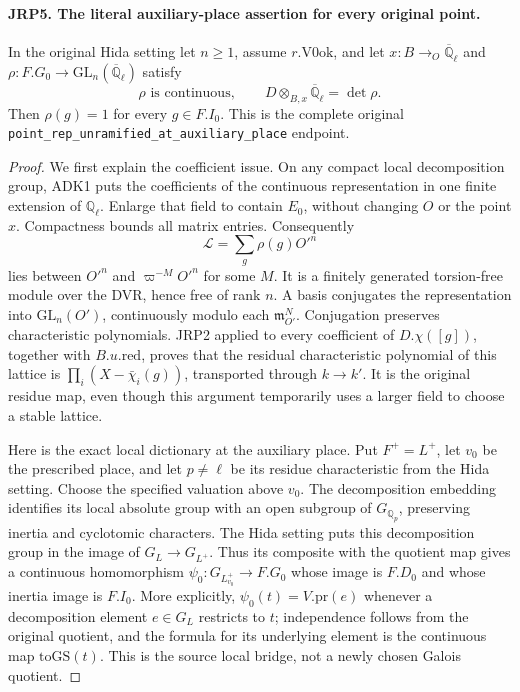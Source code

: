 \paragraph{JRP5. The literal auxiliary-place assertion for every original point.}
\label{claim:JRP5}
In the original Hida setting let \(n\ge1\), assume
\(r.\mathrm{V0ok}\), and let
\(x:B\to_O\overline{\mathbb Q}_\ell\) and
\(\rho:F.G_0\to\mathrm{GL}_n(\overline{\mathbb Q}_\ell)\)
satisfy
\[
 \rho\text{ is continuous},\qquad
                 D\otimes_{B,x}\overline{\mathbb Q}_\ell=\det\rho.
 \tag{JRP.11}
\]
Then \(\rho(g)=1\) for every \(g\in F.I_0\).
This is the complete original
\texttt{point\_\allowbreak rep\_\allowbreak unramified\_\allowbreak at\_\allowbreak auxiliary\_\allowbreak place} endpoint.
\begin{proof}
We first explain the coefficient issue.  On any compact local
decomposition group, ADK1 puts the coefficients of the continuous
representation in one finite extension of \(\mathbb Q_\ell\).
Enlarge that field to contain \(E_0\), without changing \(O\)
or the point \(x\).  Compactness bounds all matrix entries.
Consequently
\[
 \mathcal L=\sum_g\rho(g)O'^n
\]
lies between \(O'^n\) and \(\varpi^{-M}O'^n\) for some
\(M\).  It is a finitely generated torsion-free module over the
DVR, hence free of rank \(n\).  A basis conjugates the
representation into \(\mathrm{GL}_n(O')\), continuously modulo
each \(\mathfrak m_{O'}^N\).  Conjugation preserves characteristic
polynomials.  JRP2 applied to every coefficient of
\(D.\chi([g])\), together with \(B.u.\mathrm{red}\), proves
that the residual characteristic polynomial of this lattice is
\(\prod_i(X-\bar\chi_i(g))\), transported through \(k\to k'\).
It is the original residue map, even though this argument temporarily
uses a larger field to choose a stable lattice.

Here is the exact local dictionary at the auxiliary place.  Put
\(F^+=L^+\), let \(v_0\) be the prescribed place, and let
\(p\ne\ell\) be its residue characteristic from the Hida setting.
Choose the specified valuation above \(v_0\).  The decomposition
embedding identifies its local absolute group with an open subgroup
of \(G_{\mathbb Q_p}\), preserving inertia and cyclotomic
characters.  The Hida setting puts this decomposition group in the
image of \(G_L\to G_{L^+}\).  Thus its composite with the
quotient map gives a continuous homomorphism
\(\psi_0:G_{L^+_{v_0}}\to F.G_0\) whose image is \(F.D_0\)
and whose inertia image is \(F.I_0\).  More explicitly,
\(\psi_0(t)=V.\mathrm{pr}(e)\) whenever a decomposition element
\(e\in G_L\) restricts to \(t\); independence follows from
the original quotient, and the formula for its underlying element
is the continuous map \(\mathrm{toGS}(t)\).  This is the source
local bridge, not a newly chosen Galois quotient.


\end{proof}
